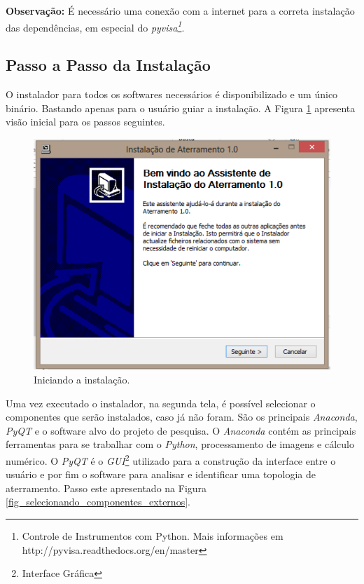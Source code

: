 \documentclass[a4paper, 10pt]{article}
\begin{document}
\textbf{Observação:} É necessário uma conexão com a internet para a correta 
instalação das dependências, em especial do  \textit{pyvisa\footnote{Controle de Instrumentos com Python. Mais informações em http://pyvisa.readthedocs.org/en/master}}.


\subsection{Passo a Passo da Instalação}

O instalador para todos os softwares necessários é disponibilizado e um único
binário. Bastando apenas para o usuário guiar a instalação. A Figura \ref{fig_iniciando_instalacao} apresenta visão inicial para os passos seguintes.

\begin{figure}[!h]
        \caption{\label{fig_iniciando_instalacao}Iniciando a instalação.}
	    \begin{center}
            \includegraphics[scale=0.7]{../fotos/instalacao/parte1_executando.pdf}
	    \end{center}
\end{figure}

Uma vez executado o instalador, na segunda tela, é possível selecionar o componentes 
que serão instalados, caso já não foram. São os principais \textit{Anaconda}, \textit{PyQT} e o software
alvo do projeto de pesquisa. O \textit{Anaconda} contém as principais ferramentas para se
trabalhar com o \textit{Python}, processamento de imagens e cálculo numérico. O \textit{PyQT} é 
o \textit{GUI}\footnote{Interface Gráfica} utilizado para a construção da interface entre o usuário e por fim 
o software para analisar e identificar uma topologia de aterramento. Passo este apresentado 
na Figura \ref{fig_selecionando_componentes_externos}. 
\end{document}
